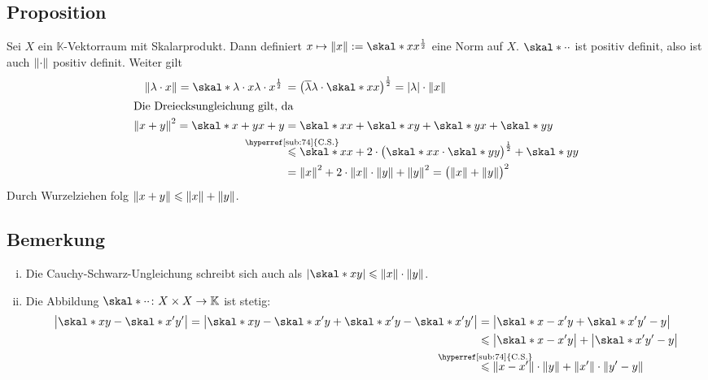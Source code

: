 \subsection[Proposition: Ein Skalarprodukt definiert eine Norm]{Proposition} %
\label{sub:75}
Sei $X$ ein $\mathds{K}$-Vektorraum mit Skalarprodukt. Dann definiert $x \mapsto \norm{x} := \skal*{x}{x}^{\frac{1}{2}}$ eine Norm auf $X$.
$\skal*{\cdot}{\cdot}$ ist positiv definit, also ist auch $\norm{\cdot}$ positiv definit. Weiter gilt
\begin{align*}
	\norm{\lambda \cdot x} = \skal*{\lambda \cdot x}{\lambda \cdot x}^{\frac{1}{2}} \,&= \enbrace*{\overline{\lambda} \lambda \cdot \skal*{x}{x}}^{\frac{1}{2}} 
	= \abs*{\lambda} \cdot \norm{x}    \\
	\intertext{Die Dreiecksungleichung gilt, da}
	\norm{x+y}^2 = \skal*{x+y}{x+y} &= \skal*{x}{x} + \skal*{x}{y} + \skal*{y}{x} + \skal*{y}{y} \\
	&\stackrel{\mathclap{\mbox{\scriptsize \hyperref[sub:74]{C.S.}}}}{\le} \skal*{x}{x} + 2 \cdot \enbrace[\big]{\skal*{x}{x} \cdot \skal*{y}{y}}^{\frac{1}{2}}
	+ \skal*{y}{y}  \\
	&= \norm{x}^2 + 2 \cdot \norm{x} \cdot \norm{y} + \norm{y}^2 = \enbrace[\big]{\norm{x} + \norm{y}}^2    
\end{align*}
Durch Wurzelziehen folg $\norm{x+y} \le \norm{x} + \norm{y}$. \bewende

\subsection[Bemerkungen über Cauchy-Schwarz und die Stetigkeit von $\skal*{\cdot}{\cdot}$]{Bemerkung} %
\label{sub:76}
\begin{enumerate}[(i)]
	\item Die Cauchy-Schwarz-Ungleichung schreibt sich auch als $\abs*{\skal*{x}{y}} \le \norm{x} \cdot \norm{y}$.
	\item Die Abbildung $\skal*{\cdot}{\cdot} \colon X \times X \to \mathds{K}$ ist stetig:
	\begin{align*}
		\abs[\big]{\skal*{x}{y}- \skal*{x'}{y'}} = \abs[\big]{\skal*{x}{y} -\skal*{x'}{y} + \skal*{x'}{y} -\skal*{x'}{y'}} &= \abs[\big]{\skal*{x-x'}{y} +\skal*{x'}{y'-y}}\\
		&\le \abs[\big]{\skal*{x-x'}{y}} + \abs[\big]{\skal*{x'}{y'-y}} \\
		&\stackrel{\mathclap{\mbox{\scriptsize \hyperref[sub:74]{C.S.}}}}{\le} \norm{x-x'} \cdot \norm{y} + \norm{x'} \cdot \norm{y'-y}    
	\end{align*}
\end{enumerate}

